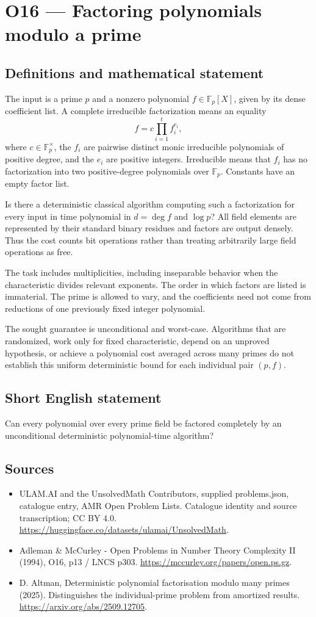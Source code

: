 \documentclass[11pt,a4paper]{article}
\begin{document}
\section*{O16 — Factoring polynomials modulo a prime}\label{statement}

\subsection{Definitions and mathematical statement}
The input is a prime $p$ and a nonzero polynomial $f\in\mathbb F_p[X]$, given by its dense coefficient list. A complete irreducible factorization means an equality
\[
f=c\prod_{i=1}^t f_i^{e_i},
\]
where $c\in\mathbb F_p^\times$, the $f_i$ are pairwise distinct monic irreducible polynomials of positive degree, and the $e_i$ are positive integers. Irreducible means that $f_i$ has no factorization into two positive-degree polynomials over $\mathbb F_p$. Constants have an empty factor list.

Is there a deterministic classical algorithm computing such a factorization for every input in time polynomial in $d=\deg f$ and $\log p$? All field elements are represented by their standard binary residues and factors are output densely. Thus the cost counts bit operations rather than treating arbitrarily large field operations as free.

The task includes multiplicities, including inseparable behavior when the characteristic divides relevant exponents. The order in which factors are listed is immaterial. The prime is allowed to vary, and the coefficients need not come from reductions of one previously fixed integer polynomial.

The sought guarantee is unconditional and worst-case. Algorithms that are randomized, work only for fixed characteristic, depend on an unproved hypothesis, or achieve a polynomial cost averaged across many primes do not establish this uniform deterministic bound for each individual pair $(p,f)$.
\subsection{Short English statement}
Can every polynomial over every prime field be factored completely by an unconditional deterministic polynomial-time algorithm?
\subsection{Sources}
\begin{itemize}
\item[S1] ULAM.AI and the UnsolvedMath Contributors, supplied problems.json, catalogue entry, AMR Open Problem Lists. Catalogue identity and source transcription; CC BY 4.0.
\url{https://huggingface.co/datasets/ulamai/UnsolvedMath}.
\item[S2] Adleman \& McCurley - Open Problems in Number Theory Complexity II (1994), O16, p13 / LNCS p303. 
\url{https://mccurley.org/papers/open.ps.gz}.
\item[S3] D. Altman, Deterministic polynomial factorisation modulo many primes (2025). Distinguishes the individual-prime problem from amortized results.
\url{https://arxiv.org/abs/2509.12705}.
\end{itemize}
\end{document}
